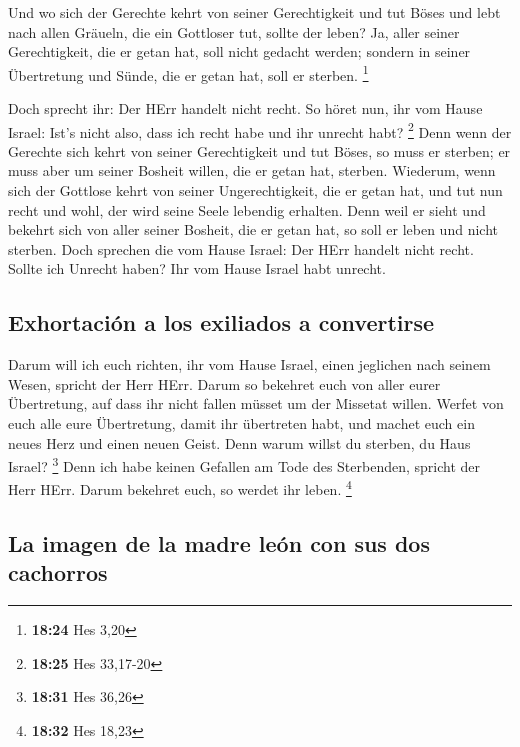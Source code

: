  Und wo sich der Gerechte kehrt von seiner Gerechtigkeit
und tut Böses und lebt nach allen Gräueln, die ein Gottloser tut, sollte
der leben? Ja, aller seiner Gerechtigkeit, die er getan hat, soll nicht
gedacht werden; sondern in seiner Übertretung und Sünde, die er getan
hat, soll er sterben. \footnote{\textbf{18:24} Hes 3,20}

 Doch sprecht ihr: Der HErr handelt nicht recht. So höret
nun, ihr vom Hause Israel: Ist's nicht also, dass ich recht habe und ihr
unrecht habt? \footnote{\textbf{18:25} Hes 33,17-20} 
Denn wenn der Gerechte sich kehrt von seiner Gerechtigkeit und tut
Böses, so muss er sterben; er muss aber um seiner Bosheit willen, die er
getan hat, sterben.  Wiederum, wenn sich der Gottlose
kehrt von seiner Ungerechtigkeit, die er getan hat, und tut nun recht
und wohl, der wird seine Seele lebendig erhalten.  Denn
weil er sieht und bekehrt sich von aller seiner Bosheit, die er getan
hat, so soll er leben und nicht sterben.  Doch sprechen
die vom Hause Israel: Der HErr handelt nicht recht. Sollte ich Unrecht
haben? Ihr vom Hause Israel habt unrecht.

\hypertarget{exhortaciuxf3n-a-los-exiliados-a-convertirse}{%
\subsection{Exhortación a los exiliados a
convertirse}\label{exhortaciuxf3n-a-los-exiliados-a-convertirse}}

 Darum will ich euch richten, ihr vom Hause Israel, einen
jeglichen nach seinem Wesen, spricht der Herr HErr. Darum so bekehret
euch von aller eurer Übertretung, auf dass ihr nicht fallen müsset um
der Missetat willen.  Werfet von euch alle eure
Übertretung, damit ihr übertreten habt, und machet euch ein neues Herz
und einen neuen Geist. Denn warum willst du sterben, du Haus Israel?
\footnote{\textbf{18:31} Hes 36,26}  Denn ich habe keinen
Gefallen am Tode des Sterbenden, spricht der Herr HErr. Darum bekehret
euch, so werdet ihr leben. \footnote{\textbf{18:32} Hes 18,23}

\hypertarget{la-imagen-de-la-madre-leuxf3n-con-sus-dos-cachorros}{%
\subsection{La imagen de la madre león con sus dos
cachorros}\label{la-imagen-de-la-madre-leuxf3n-con-sus-dos-cachorros}}

